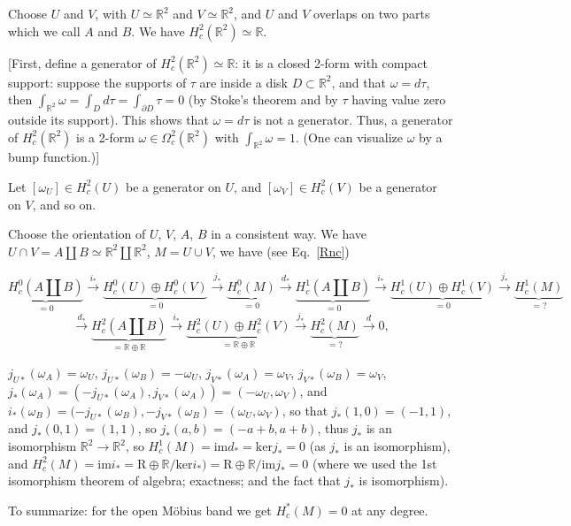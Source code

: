 \documentclass{article}
\theoremstyle{mystyle}
\theoremstyle{remark}
\numberwithin{equation}{section}
\begin{document}
Choose $U$ and $V$, with $U\simeq \mathbb{R}^2$ and $V\simeq \mathbb{R}^2$, and $U$ and $V$ overlaps on two parts which we call $A$ and $B$. We have $H^2_c(\mathbb{R}^2) \simeq \mathbb{R}$.

[First, define a generator of $H^2_c(\mathbb{R}^2) \simeq \mathbb{R}$: it is a closed 2-form with compact support: suppose the supports of $\tau$ are inside a disk $D\subset \mathbb{R}^2$, and that $\omega = d\tau$, then $\int_{\mathbb{R}^2}\omega = \int_D d\tau = \int_{\partial D}\tau=0$ (by Stoke's theorem and by $\tau$ having value zero outside its support). This shows that $\omega =d\tau$ is not a generator. Thus, a generator of $H^2_c(\mathbb{R}^2)$ is a 2-form $\omega \in \Omega^2_c(\mathbb{R}^2)$ with $\int_{\mathbb{R}^2}\omega = 1$. (One can visualize $\omega$ by a bump function.)]

Let $[\omega_U]\in H^2_c(U)$ be a generator on $U$,  and $[\omega_V]\in H^2_c(V)$ be a generator on $V$, and so on.

Choose the orientation of $U$, $V$, $A$, $B$ in a consistent way. We have $U\cap V = A\amalg B \simeq \mathbb{R}^2\amalg \mathbb{R}^2$, $M=U\cup V$, we have (see Eq.~\eqref{Rnc})

$$\underbrace{H^0_c(A\amalg B)}_{=0}\xrightarrow{i_*}\underbrace{H^0_c(U)\oplus H^0_c(V)}_{=0}\xrightarrow{j_*}\underbrace{H^0_c(M)}_{=0}\xrightarrow{d_*} \underbrace{H^1_c(A\amalg B)}_{=0}\xrightarrow{i_*}\underbrace{H^1_c(U)\oplus H^1_c(V)}_{=0}\xrightarrow{j_*}\underbrace{H^1_c(M)}_{=?}$$
$$\xrightarrow{d_*}
 \underbrace{H^2_c(A\amalg B)}_{=\mathbb{R}\oplus \mathbb{R}}\xrightarrow{i_*}\underbrace{H^2_c(U)\oplus H^2_c(V)}_{=\mathbb{R}\oplus \mathbb{R}}\xrightarrow{j_*}\underbrace{H^2_c(M)}_{=?}\xrightarrow{d}0,$$
 
 $j_{U*}(\omega_A) = \omega_U$, $j_{U*}(\omega_B)=-\omega_U$, $j_{V*}(\omega_A) = \omega_V$, $j_{V*}(\omega_B) = \omega_V$, $j_*(\omega_A) = (-j_{U*}(\omega_A),j_{V*}(\omega_A)) = (-\omega_U,\omega_V)$, and $i_*(\omega_B) = (-j_{U*}(\omega_B),-j_{V*}(\omega_B) = (\omega_U,\omega_V)$,  so that $j_*(1,0)=(-1,1)$, and $j_*(0,1)=(1,1)$, so $j_*(a,b) = (-a+b,a+b)$, thus $j_*$ is an isomorphism $\mathbb{R}^2\rightarrow \mathbb{R}^2$,  so $H^1_c(M) = \mathrm{im}d_* = \mathrm{ker}j_*=0$ (as $j_*$ is an isomorphism), and $H^2_c(M) = \mathrm{im}i_* = \mathrm{R}\oplus \mathbb{R}/\mathrm{ker}i_*) = \mathrm{R}\oplus \mathbb{R}/\mathrm{im}j_* = 0$ (where we used the 1st isomorphism theorem of algebra; exactness; and the fact that $j_*$ is isomorphism).

To summarize: for the open Möbius band we get $H^*_c(M)=0$ at any degree.
\end{document}
